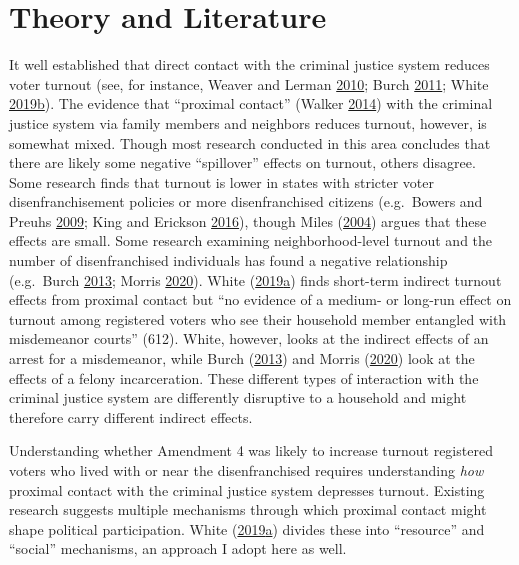 \documentclass[
  12pt,
]{article}
\begin{document}
\hypertarget{theory-and-literature}{%
\section*{Theory and Literature}\label{theory-and-literature}}

It well established that direct contact with the criminal justice system reduces voter turnout (see, for instance, Weaver and Lerman \protect\hyperlink{ref-Weaver2010}{2010}; Burch \protect\hyperlink{ref-Burch2011}{2011}; White \protect\hyperlink{ref-White2019}{2019}\protect\hyperlink{ref-White2019}{b}). The evidence that ``proximal contact'' (Walker \protect\hyperlink{ref-Walker2014}{2014}) with the criminal justice system via family members and neighbors reduces turnout, however, is somewhat mixed. Though most research conducted in this area concludes that there are likely some negative ``spillover'' effects on turnout, others disagree. Some research finds that turnout is lower in states with stricter voter disenfranchisement policies or more disenfranchised citizens (e.g.~Bowers and Preuhs \protect\hyperlink{ref-Bowers2009}{2009}; King and Erickson \protect\hyperlink{ref-King2016}{2016}), though Miles (\protect\hyperlink{ref-Miles2004}{2004}) argues that these effects are small. Some research examining neighborhood-level turnout and the number of disenfranchised individuals has found a negative relationship (e.g.~Burch \protect\hyperlink{ref-Burch2013}{2013}; Morris \protect\hyperlink{ref-Morris2020}{2020}). White (\protect\hyperlink{ref-White2019a}{2019}\protect\hyperlink{ref-White2019a}{a}) finds short-term indirect turnout effects from proximal contact but ``no evidence of a medium- or long-run effect on turnout among registered voters who see their household member entangled with misdemeanor courts'' (612). White, however, looks at the indirect effects of an arrest for a misdemeanor, while Burch (\protect\hyperlink{ref-Burch2013}{2013}) and Morris (\protect\hyperlink{ref-Morris2020}{2020}) look at the effects of a felony incarceration. These different types of interaction with the criminal justice system are differently disruptive to a household and might therefore carry different indirect effects.

Understanding whether Amendment 4 was likely to increase turnout registered voters who lived with or near the disenfranchised requires understanding \emph{how} proximal contact with the criminal justice system depresses turnout. Existing research suggests multiple mechanisms through which proximal contact might shape political participation. White (\protect\hyperlink{ref-White2019a}{2019}\protect\hyperlink{ref-White2019a}{a}) divides these into ``resource'' and ``social'' mechanisms, an approach I adopt here as well.
\end{document}
